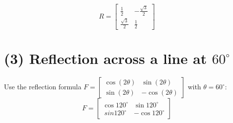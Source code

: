 \[
R =
\begin{bmatrix}
\frac{1}{2} & -\frac{\sqrt{3}}{2} \\
\frac{\sqrt{3}}{2} & \frac{1}{2}
\end{bmatrix}
\]

\section*{(3) Reflection across a line at $60^\circ$}

Use the reflection formula $F = \begin{bmatrix}\cos(2\theta) & \sin(2\theta) \\ \sin(2\theta) & -\cos(2\theta)
\end{bmatrix}$ with $\theta = 60^\circ$:
\[
F =
\begin{bmatrix}
\cos120^\circ & \sin 120^\circ \\ \ sin120^\circ & -\cos 120^\circ 
\end{bmatrix}
\]
